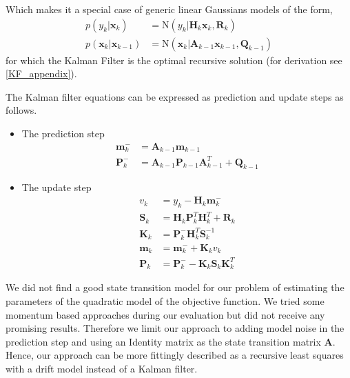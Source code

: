Which makes it a special case of generic linear Gaussians
models of the form, 
\begin{align*}
  p(y_k | \mathbf{x}_k) &= \text{N}(y_k | \mathbf{H}_k \mathbf{x}_k,
                          \mathbf{R}_k) \\
  p(\mathbf{x}_k | \mathbf{x}_{k-1}) &= \text{N}(\mathbf{x}_k
                                      | \mathbf{A}_{k-1} \mathbf{x}_{k-1},
                                      \mathbf{Q}_{k-1})
\end{align*}
for which the Kalman Filter is the optimal recursive solution
(for derivation see  \cref{KF_appendix}).

The Kalman filter equations can be expressed as
prediction and update steps as follows.
\begin{itemize}
\item The prediction step
  \begin{equation}
    \label{KF_prediction}
    \begin{aligned}
      \mathbf{m}_k^- &= \mathbf{A}_{k-1} \mathbf{m}_{k-1} \\
      \mathbf{P}_k^- &= \mathbf{A}_{k-1} \mathbf{P}_{k-1} \mathbf{A}^T_{k-1}
      + \mathbf{Q}_{k-1}
    \end{aligned}
  \end{equation}

\item The update step
  \begin{equation}
    \label{KF_update}
    \begin{aligned}
      v_k &= y_k - \mathbf{H}_k \mathbf{m}_k^- \\
      \mathbf{S}_k &= \mathbf{H}_k \mathbf{P}_k^T \mathbf{H}^T_k +
      \mathbf{R}_k \\
      \mathbf{K}_k &= \mathbf{P}_k^- \mathbf{H}_k^T \mathbf{S}_k^{-1} \\
      \mathbf{m}_k &= \mathbf{m}_k^- + \mathbf{K}_k v_k \\
      \mathbf{P}_k &= \mathbf{P}_k^- - \mathbf{K}_k \mathbf{S}_k \mathbf{K}_k^T
    \end{aligned}
  \end{equation}
\end{itemize}


We did not find a good state transition model for our problem of
estimating the parameters of the quadratic model of the objective function.
We tried some momentum based approaches during our evaluation but
did not receive any promising results. Therefore we limit our approach to
adding model noise in the prediction step and
using an Identity matrix as the state transition matrix $\mathbf{A}$.
Hence, our approach can be more fittingly described as
a recursive least squares with a drift model instead of a Kalman filter.

